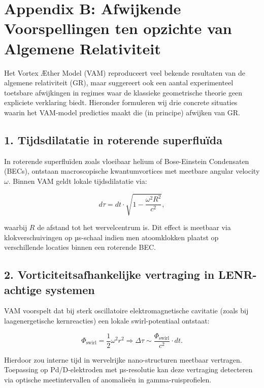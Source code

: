 \section*{Appendix B: Afwijkende Voorspellingen ten opzichte van Algemene Relativiteit}
\label{appendix:AfwijkendeVoorspellingen}

Het Vortex Æther Model (VAM) reproduceert veel bekende resultaten van de algemene relativiteit (GR), maar suggereert ook een aantal experimenteel toetsbare afwijkingen in regimes waar de klassieke geometrische theorie geen expliciete verklaring biedt. Hieronder formuleren wij drie concrete situaties waarin het VAM-model predicties maakt die (in principe) afwijken van GR.

\subsection*{1. Tijdsdilatatie in roterende superfluïda}

In roterende superfluïden zoals vloeibaar helium of Bose-Einstein Condensaten (BECs), ontstaan macroscopische kwantumvortices met meetbare angular velocity \( \omega \). Binnen VAM geldt lokale tijdsdilatatie via:

\begin{equation}
    d\tau = dt \cdot \sqrt{1 - \frac{\omega^2 R^2}{c^2}},\label{eq:vortex_tau}
\end{equation}

waarbij \( R \) de afstand tot het wervelcentrum is. Dit effect is meetbaar via klokverschuivingen op µs-schaal indien men atoomklokken plaatst op verschillende locaties binnen een roterende BEC.

\subsection*{2. Vorticiteitsafhankelijke vertraging in LENR-achtige systemen}

VAM voorspelt dat bij sterk oscillatoire elektromagnetische cavitatie (zoals bij laagenergetische kernreacties) een lokale swirl-potentiaal ontstaat:

\begin{equation}
    \Phi_{\text{swirl}} = \frac{1}{2} \omega^2 r^2 \Rightarrow \Delta \tau \sim \frac{\Phi_{\text{swirl}}}{c^2} \cdot dt.\label{eq:swirl_tau}
\end{equation}

Hierdoor zou interne tijd in wervelrijke nano-structuren meetbaar vertragen. Toepassing op Pd/D-elektroden met µs-resolutie kan deze vertraging detecteren via optische meetintervallen of anomalieën in gamma-ruisprofielen.

